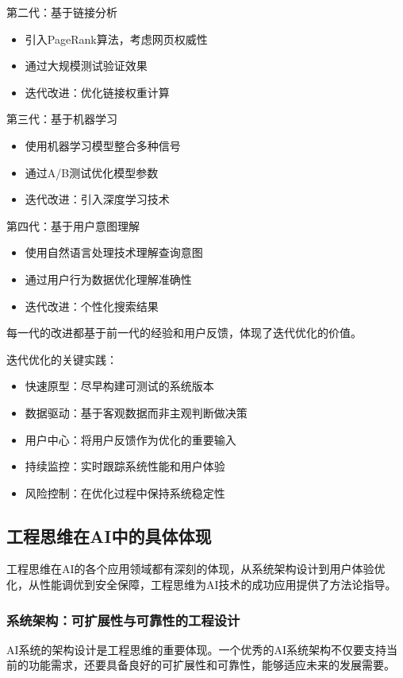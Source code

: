第二代：基于链接分析
\begin{itemize}
\item 引入PageRank算法，考虑网页权威性
\item 通过大规模测试验证效果
\item 迭代改进：优化链接权重计算
\end{itemize}

第三代：基于机器学习
\begin{itemize}
\item 使用机器学习模型整合多种信号
\item 通过A/B测试优化模型参数
\item 迭代改进：引入深度学习技术
\end{itemize}

第四代：基于用户意图理解
\begin{itemize}
\item 使用自然语言处理技术理解查询意图
\item 通过用户行为数据优化理解准确性
\item 迭代改进：个性化搜索结果
\end{itemize}

每一代的改进都基于前一代的经验和用户反馈，体现了迭代优化的价值。

迭代优化的关键实践：

\begin{itemize}
\item 快速原型：尽早构建可测试的系统版本
\item 数据驱动：基于客观数据而非主观判断做决策
\item 用户中心：将用户反馈作为优化的重要输入
\item 持续监控：实时跟踪系统性能和用户体验
\item 风险控制：在优化过程中保持系统稳定性
\end{itemize}

\subsection{工程思维在AI中的具体体现}

工程思维在AI的各个应用领域都有深刻的体现，从系统架构设计到用户体验优化，从性能调优到安全保障，工程思维为AI技术的成功应用提供了方法论指导。

\subsubsection{系统架构：可扩展性与可靠性的工程设计}

AI系统的架构设计是工程思维的重要体现。一个优秀的AI系统架构不仅要支持当前的功能需求，还要具备良好的可扩展性和可靠性，能够适应未来的发展需要。

